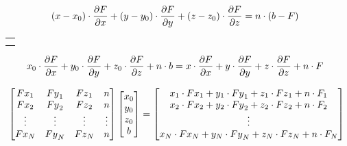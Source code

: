 \begin{equation} \label{eq:euler1}
\centering
(x-x_0) \cdot \frac{\partial F}{\partial x} + (y-y_0) \cdot \frac{\partial F}{\partial y}+(z-z_0) \cdot \frac{\partial F}{\partial z}=n \cdot (b-F)  \ \ 
\end{equation}

\begin{tabular}{ l }
\noindent{where: n is the structural index, that is, a gauge of the geometric shape of the}  \\
\noindent{sources causing the anomaly; and b is the constant, and unknown, base level.}  \\
\end{tabular}

\bigskip


\begin{equation} \label{eq:euler2}
\centering
x_0 \cdot \frac{\partial F}{\partial x} + y_0 \cdot \frac{\partial F}{\partial y} + z_0 \cdot \frac{\partial F}{\partial z} + n \cdot b = x \cdot \frac{\partial F}{\partial x} + y \cdot \frac{\partial F}{\partial y} + z \cdot \frac{\partial F}{\partial z} + n \cdot F  \ \ 
\end{equation}


\begin{equation} \label{eq:euler3}
\centering
\left[\begin{matrix}{Fx}_1&{Fy}_1&{Fz}_1&n\\{Fx}_2&{Fy}_2&{Fz}_2&n\\\vdots&\vdots&\vdots&\vdots\\{Fx}_N&{Fy}_N&{Fz}_N&n\\\end{matrix}\right]\left[\begin{matrix}x_0\\y_0\\z_0\\b\\\end{matrix}\right]=\left[\begin{matrix}x_1\cdot{Fx}_1+y_1 \cdot {Fy}_1+z_1 \cdot {Fz}_1+n\cdot F_1\\x_2\cdot{Fx}_2+y_2\cdot{Fy}_2+z_2\cdot{Fz}_2+n\cdot F_2\\\vdots\\x_N\cdot{Fx}_N+y_N\cdot{Fy}_N+z_N\cdot{Fz}_N+n\cdot F_N\\\end{matrix}\right]\ 
\end{equation}

